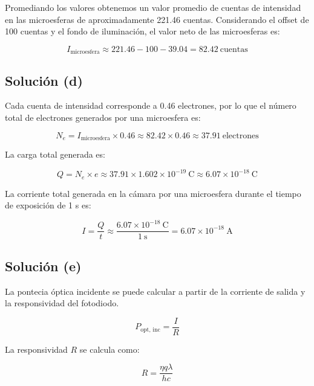 \documentclass[11pt]{article}
\begin{document}
Promediando los valores obtenemos un valor promedio de cuentas de intensidad en las microesferas de aproximadamente 221.46 cuentas. Considerando el offset de 100 cuentas y el fondo de iluminación, el valor neto de las microesferas es:

\begin{equation*}
    I_{\text{microesfera}} \approx 221.46 - 100 - 39.04 = 82.42\ \text{cuentas}
\end{equation*}

\subsection*{Solución (d)}

Cada cuenta de intensidad corresponde a 0.46 electrones, por lo que el número total de electrones generados por una microesfera es:

\begin{equation*}
    N_e = I_{\text{microesfera}} \times 0.46 \approx 82.42 \times 0.46 \approx 37.91\ \text{electrones}
\end{equation*}

La carga total generada es:

\begin{equation*}
    Q = N_e \times e \approx 37.91 \times 1.602 \times 10^{-19}\ \text{C} \approx 6.07 \times 10^{-18}\ \text{C}
\end{equation*}

La corriente total generada en la cámara por una microesfera durante el tiempo de exposición de 1 s es:

\begin{equation*}
    I = \frac{Q}{t} \approx \frac{6.07 \times 10^{-18}\ \text{C}}{1\ \text{s}} = 6.07 \times 10^{-18}\ \text{A}
\end{equation*}

\subsection*{Solución (e)}

La pontecia óptica incidente se puede calcular a partir de la corriente de salida y la responsividad del fotodiodo.

\begin{equation*}
    P_{\text{opt, inc}} = \frac{I}{R}
\end{equation*}

La responsividad $R$ se calcula como:

\begin{equation*}
    R = \frac{\eta q \lambda}{h c}
\end{equation*}
\end{document}

